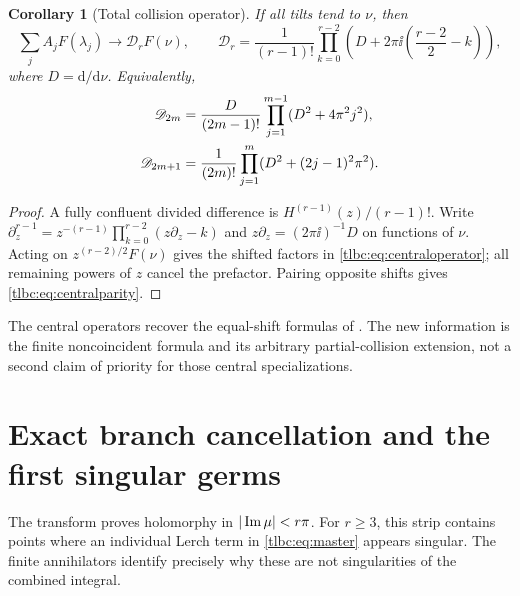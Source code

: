 \documentclass[11pt,letterpaper]{article}
\numberwithin{equation}{section}
\newtheorem{corollary}[theorem]{Corollary}
\theoremstyle{definition}\newtheorem{definition}[theorem]{Definition}
\theoremstyle{remark}\newtheorem{remark}[theorem]{Remark}
\begin{document}
\begin{corollary}[Total collision operator]\label{tlbc:cor:central}
If all tilts tend to $\nu$, then
\begin{equation}\label{tlbc:eq:centraloperator}
 \sum_j A_jF(\lambda_j)\longrightarrow
 \mathscr D_rF(\nu),\qquad
 \mathscr D_r=\frac1{(r-1)!}
 \prod_{k=0}^{r-2}\left(D+2\pi\ii\left(\frac{r-2}{2}-k\right)\right),
\end{equation}
where $D=\mathrm d/\mathrm d\nu$. Equivalently,
\begin{align}
 \mathscr D_{2m}&=\frac{D}{(2m-1)!}
       \prod_{j=1}^{m-1}(D^2+4\pi^2j^2),\notag\\
 \mathscr D_{2m+1}&=\frac1{(2m)!}
       \prod_{j=1}^{m}(D^2+(2j-1)^2\pi^2).
 \label{tlbc:eq:centralparity}
\end{align}
\end{corollary}
\begin{proof}
A fully confluent divided difference is $H^{(r-1)}(z)/(r-1)!$. Write
$\partial_z^{r-1}=z^{-(r-1)}\prod_{k=0}^{r-2}(z\partial_z-k)$ and
$z\partial_z=(2\pi\ii)^{-1}D$ on functions of $\nu$. Acting on $z^{(r-2)/2}F(\nu)$ gives the shifted factors in \eqref{tlbc:eq:centraloperator}; all remaining powers of $z$ cancel the prefactor. Pairing opposite shifts gives \eqref{tlbc:eq:centralparity}.
\end{proof}
The central operators recover the equal-shift formulas of \cite{RLC}. The new information is the finite noncoincident formula and its arbitrary partial-collision extension, not a second claim of priority for those central specializations.

\section{Exact branch cancellation and the first singular germs}
\label{tlbc:sec:branches}
The transform proves holomorphy in $|\operatorname{Im}\mu|<r\pi$. For $r\ge3$, this strip contains points where an individual Lerch term in \eqref{tlbc:eq:master} appears singular. The finite annihilators identify precisely why these are not singularities of the combined integral.
\end{document}

